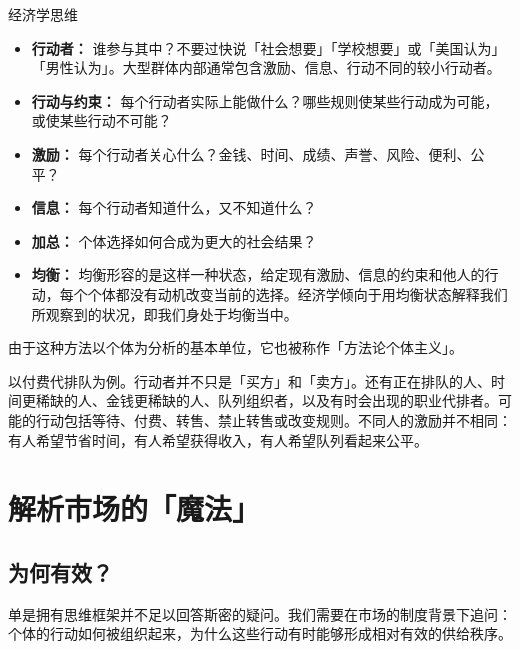 \documentclass[UTF8,10pt,a4paper,scheme=chinese]{ctexart}
\begin{document}
\begin{conceptbox}{经济学思维}
\begin{itemize}
  \item \textbf{行动者：} 谁参与其中？不要过快说「社会想要」「学校想要」或「美国认为」「男性认为」。大型群体内部通常包含激励、信息、行动不同的较小行动者。
  \item \textbf{行动与约束：} 每个行动者实际上能做什么？哪些规则使某些行动成为可能，或使某些行动不可能？
  \item \textbf{激励：} 每个行动者关心什么？金钱、时间、成绩、声誉、风险、便利、公平？
  \item \textbf{信息：} 每个行动者知道什么，又不知道什么？
  \item \textbf{加总：} 个体选择如何合成为更大的社会结果？
  \item \textbf{均衡：} 均衡形容的是这样一种状态，给定现有激励、信息的约束和他人的行动，每个个体都没有动机改变当前的选择。经济学倾向于用均衡状态解释我们所观察到的状况，即我们身处于均衡当中。
\end{itemize}

\end{conceptbox}

由于这种方法以个体为分析的基本单位，它也被称作「方法论个体主义」。

以付费代排队为例。行动者并不只是「买方」和「卖方」。还有正在排队的人、时间更稀缺的人、金钱更稀缺的人、队列组织者，以及有时会出现的职业代排者。可能的行动包括等待、付费、转售、禁止转售或改变规则。不同人的激励并不相同：有人希望节省时间，有人希望获得收入，有人希望队列看起来公平。

  



\section{解析市场的「魔法」}
\subsection{为何有效？}
单是拥有思维框架并不足以回答斯密的疑问。我们需要在市场的制度背景下追问：个体的行动如何被组织起来，为什么这些行动有时能够形成相对有效的供给秩序。
\end{document}
